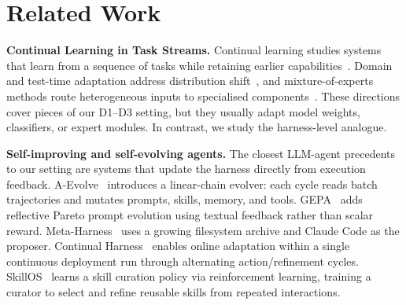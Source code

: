
\section{Related Work}
\label{sec:related}

\noindent\textbf{Continual Learning in Task Streams.}
Continual learning studies systems that learn from a sequence of tasks while retaining earlier capabilities~\cite{buzzega2020dark,wang2022learning,wang2022dualprompt}. Domain and test-time adaptation address distribution shift~\cite{ben-david2010da,ganin2016dann,wang2021tent,liang2020shot}, and mixture-of-experts methods route heterogeneous inputs to specialised components~\cite{jacobs1991moe,shazeer2017moe}. These directions cover pieces of our D1--D3 setting, but they usually adapt model weights, classifiers, or expert modules. In contrast, we study the harness-level analogue.

\noindent\textbf{Self-improving and self-evolving agents.}
The closest LLM-agent precedents to our setting are systems that update the harness directly from execution feedback. A-Evolve~\cite{lin2026position} introduces a linear-chain evolver: each cycle reads batch trajectories and mutates prompts, skills, memory, and tools. GEPA~\cite{agrawal2025gepa} adds reflective Pareto prompt evolution using textual feedback rather than scalar reward. Meta-Harness~\cite{lee2026meta} uses a growing filesystem archive and Claude Code as the proposer. Continual Harness~\cite{karten2026continual} enables online adaptation within a single continuous deployment run through alternating action/refinement cycles. SkillOS~\cite{ouyang2026skillos} learns a skill curation policy via reinforcement learning, training a curator to select and refine reusable skills from repeated interactions. 
